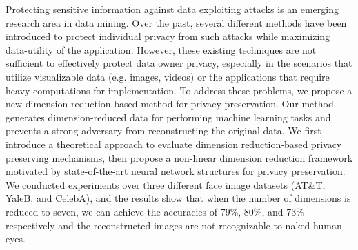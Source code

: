 

Protecting sensitive information against data exploiting attacks is an emerging research area in data mining. Over the past, several different methods have been introduced to protect individual privacy from such attacks while maximizing data-utility of the application. However, these existing techniques are not sufficient to effectively protect data owner privacy, especially in the scenarios that utilize visualizable data (e.g. images, videos) or the applications that require heavy computations for implementation. To address these problems, we propose a new dimension reduction-based method for privacy preservation. Our method generates dimension-reduced data for performing machine learning tasks and prevents a strong adversary from reconstructing the original data. We first introduce a theoretical approach to evaluate dimension reduction-based privacy preserving mechanisms, then propose a non-linear dimension reduction framework motivated by state-of-the-art neural network structures for privacy preservation. We conducted experiments over three different face image datasets (AT\&T, YaleB, and CelebA), and the results show that when the number of dimensions is reduced to seven, we can achieve the accuracies of 79\%, 80\%, and 73\% respectively and the reconstructed images are not recognizable to naked human eyes.
